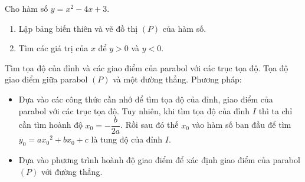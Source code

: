 \begin{bt}%
    Cho hàm số $y = x^2 - 4x + 3$.
    \begin{enumerate}
        \item Lập bảng biến thiên và vẽ đồ thị $(P)$ của hàm số. 
        \item Tìm các giá trị của $x$ để $y>0$ và $y<0$.
    \end{enumerate}
\end{bt}
\begin{dang}{Tìm tọa độ của đỉnh và các giao điểm của parabol với các trục tọa độ. Tọa độ giao điểm giữa parabol $(P)$ và một đường thẳng.}
    Phương pháp: \begin{itemize}
        \item Dựa vào các công thức cần nhớ để tìm tọa độ của đỉnh, giao điểm của parabol với các trục tọa độ. Tuy nhiên, khi tìm tọa độ của đỉnh $I$ thì ta chỉ cần tìm hoành độ $x_0 = - \dfrac{b}{2a}$. Rồi sau đó thế $x_0$ vào hàm số ban đầu để tìm $y_0=a{x_0}^2 + bx_0 + c$ là tung độ của đỉnh $I$.
        \item Dựa vào phương trình hoành độ giao điểm để xác định giao điểm của parabol $(P)$ với đường thẳng.
    \end{itemize}
\end{dang}


